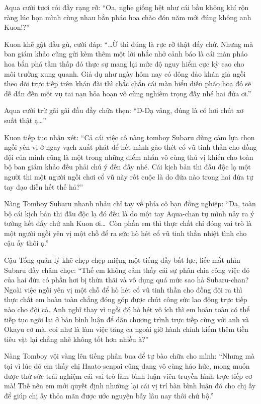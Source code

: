 \documentclass[../main.tex]{subfiles}
\begin{document}
Aqua cười tươi rói đầy rạng rỡ: ``Oa, nghe giống hệt như cái bầu không khí rộn ràng lúc bọn mình cùng nhau bắn pháo hoa chào đón năm mới đúng không anh Kuon!?''

Kuon khẽ gật đầu gù, cười đáp: ``\dots Ừ thì đúng là rực rỡ thật đấy chứ. Nhưng mà ban giám khảo cũng gửi kèm thêm một lời nhắc nhở cảnh báo là cái màn pháo hoa bắn phá tầm thấp đó thực sự mang lại mức độ nguy hiểm cực kỳ cao cho môi trường xung quanh. Giả dụ như ngày hôm nay có đông đảo khán giả ngồi theo dõi trực tiếp trên khán đài thì chắc chắn cái màn biểu diễn pháo hoa đó sẽ dễ dẫn đến một vụ tai nạn hỏa hoạn vô cùng nghiêm trọng đấy nhé hai đứa ơi.''

Aqua cười trừ gãi gãi đầu đầy chữa thẹn: ``D-Dạ vâng, đúng là có hơi chút xơ suất thật ạ\dots''

Kuon tiếp tục nhận xét: ``Cả cái việc cô nàng tomboy Subaru dũng cảm lựa chọn ngồi yên vị ở ngay vạch xuất phát để hết mình gào thét cổ vũ tinh thần cho đồng đội của mình cũng là một trong những điểm nhấn vô cùng thú vị khiến cho toàn bộ ban giám khảo đều phải chú ý đến đấy nhé. Cái kịch bản thi đấu độc lạ một người thi một người ngồi chơi cổ vũ này rốt cuộc là do đứa nào trong hai đứa tự tay đạo diễn hết thế hả?''

Nàng Tomboy Subaru nhanh nhảu chỉ tay về phía cô bạn đồng nghiệp: ``Dạ, toàn bộ cái kịch bản thi đấu độc lạ đó đều là do một tay Aqua-chan tự mình nảy ra ý tưởng hết đấy chứ anh Kuon ơi\dots\ Còn phần em thì thực chất chỉ đóng vai trò là một người ngồi yên vị một chỗ để ra sức hò hét cổ vũ tinh thần nhiệt tình cho cậu ấy thôi ạ.''

Cậu Tổng quản lý khẽ chẹp chẹp miệng một tiếng đầy bất lực, liếc mắt nhìn Subaru đầy châm chọc: ``Thế em không cảm thấy cái sự phân chia công việc đó của hai đứa có phần hơi bị thừa thãi và vô dụng quá mức sao hả Subaru-chan? Ngoài việc ngồi yên vị một chỗ để hò hét cổ vũ tinh thần cho đồng đội ra thì thực chất em hoàn toàn chẳng đóng góp được chút công sức lao động trực tiếp nào cho đội cả. Anh nghĩ thay vì ngồi đó hò hét vô ích thì em hoàn toàn có thể tiếp tục ngồi lại ở bàn bình luận để dẫn chương trình trực tiếp cùng với anh và Okayu cơ mà, coi như là làm việc tăng ca ngoài giờ hành chính kiếm thêm tiền tiêu vặt lại chẳng nhẽ không tốt hơn nhiều à?''

Nàng Tomboy vội vàng lên tiếng phân bua để tự bào chữa cho mình: ``Nhưng mà tại vì lúc đó em thấy chị Haato-senpai cũng đang vô cùng háo hức, mong muốn được thử sức trải nghiệm cái vai trò làm bình luận viên truyền hình trực tiếp cơ mà! Thế nên em mới quyết định nhường lại cái vị trí bàn bình luận đó cho chị ấy để giúp chị ấy thỏa mãn được ước nguyện bấy lâu nay thôi chứ bộ.''
\end{document}
